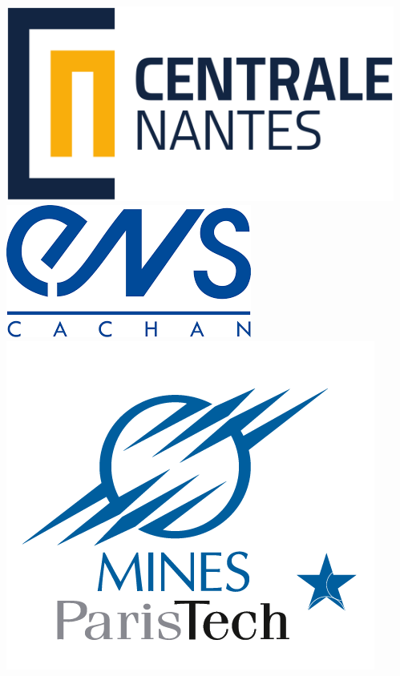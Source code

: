 \documentclass[11pt,xcolor=dvipsnames]{beamer}
\begin{document}
\begin{frame}
\begin{columns}
\begin{column}{0.8\linewidth}
\end{column}
\begin{column}{0.08\linewidth}
\includegraphics[width=0.9\linewidth]{images/centrale_nantes.png} \\
\vspace{15pt}
\includegraphics[width=0.9\linewidth]{images/ens_cachan.png} \\
\vspace{15pt}
\includegraphics[width=0.9\linewidth]{images/ecole_des_mines.png} \\

\end{column}
\end{columns}
\end{frame}
\end{document}

